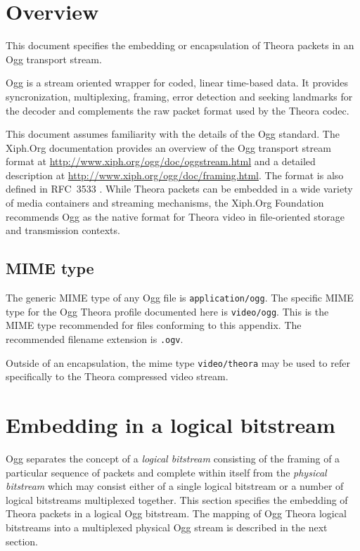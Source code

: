 \documentclass[9pt,letterpaper]{book}
\numberwithin{equation}{chapter}
\numberwithin{figure}{chapter}
\numberwithin{table}{chapter}
\begin{document}
\section{Overview}

This document specifies the embedding or encapsulation of Theora packets
 in an Ogg transport stream.

Ogg is a stream oriented wrapper for coded, linear time-based data.
It provides syncronization, multiplexing, framing, error detection and
 seeking landmarks for the decoder and complements the raw packet format
 used by the Theora codec.

This document assumes familiarity with the details of the Ogg standard.
The Xiph.Org documentation provides an overview of the Ogg transport stream
 format at \url{http://www.xiph.org/ogg/doc/oggstream.html} and a detailed
 description at \url{http://www.xiph.org/ogg/doc/framing.html}.
The format is also defined in RFC~3533 \cite{rfc3533}.
While Theora packets can be embedded in a wide variety of media
 containers and streaming mechanisms, the Xiph.Org Foundation
 recommends Ogg as the native format for Theora video in file-oriented
 storage and transmission contexts.

\subsection{MIME type}

The generic MIME type of any Ogg file is {\tt application/ogg}.
The specific MIME type for the Ogg Theora profile documented here
is {\tt video/ogg}. This is the MIME type recommended for files
conforming to this appendix. The recommended filename extension
is {\tt .ogv}.

Outside of an encapsulation, the mime type {\tt video/theora} may
 be used to refer specifically to the Theora compressed video stream.

\section{Embedding in a logical bitstream}

Ogg separates the concept of a {\em logical bitstream} consisting of the 
 framing of a particular sequence of packets and complete within itself 
 from the {\em physical bitstream} which may consist either of a single
 logical bitstream or a number of logical bitstreams multiplexed
 together.
This section specifies the embedding of Theora packets in a logical Ogg
 bitstream.
The mapping of Ogg Theora logical bitstreams into a multiplexed physical Ogg
 stream is described in the next section.
\end{document}
